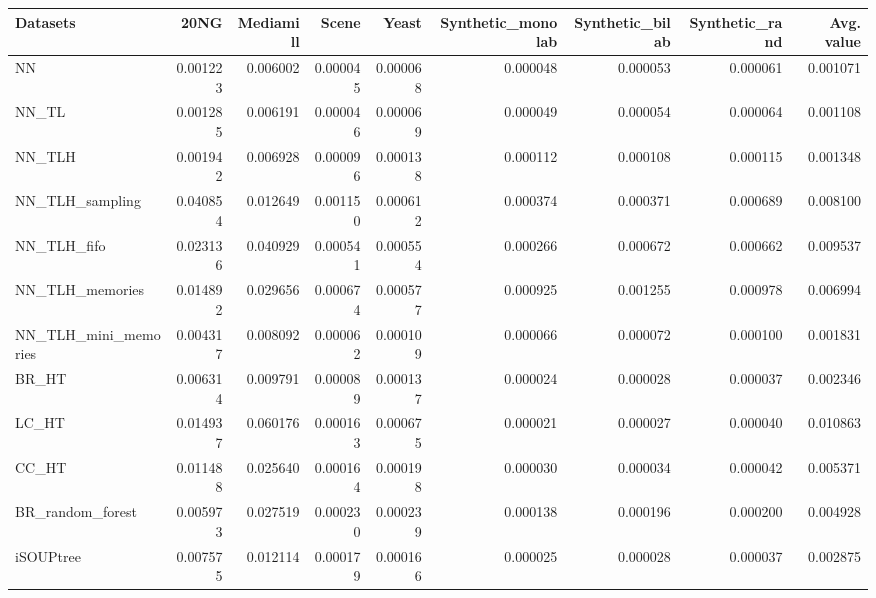 \begin{tabular}{lrrrrrrrr}
\toprule
Datasets &      20NG &  Mediamill &     Scene &     Yeast &  Synthetic\_monolab &  Synthetic\_bilab &  Synthetic\_rand &  Avg. value \\
\midrule
NN                   &  0.001223 &   0.006002 &  0.000045 &  0.000068 &           0.000048 &         0.000053 &        0.000061 &    0.001071 \\
NN\_TL                &  0.001285 &   0.006191 &  0.000046 &  0.000069 &           0.000049 &         0.000054 &        0.000064 &    0.001108 \\
NN\_TLH               &  0.001942 &   0.006928 &  0.000096 &  0.000138 &           0.000112 &         0.000108 &        0.000115 &    0.001348 \\
NN\_TLH\_sampling      &  0.040854 &   0.012649 &  0.001150 &  0.000612 &           0.000374 &         0.000371 &        0.000689 &    0.008100 \\
NN\_TLH\_fifo          &  0.023136 &   0.040929 &  0.000541 &  0.000554 &           0.000266 &         0.000672 &        0.000662 &    0.009537 \\
NN\_TLH\_memories      &  0.014892 &   0.029656 &  0.000674 &  0.000577 &           0.000925 &         0.001255 &        0.000978 &    0.006994 \\
NN\_TLH\_mini\_memories &  0.004317 &   0.008092 &  0.000062 &  0.000109 &           0.000066 &         0.000072 &        0.000100 &    0.001831 \\
BR\_HT                &  0.006314 &   0.009791 &  0.000089 &  0.000137 &           0.000024 &         0.000028 &        0.000037 &    0.002346 \\
LC\_HT                &  0.014937 &   0.060176 &  0.000163 &  0.000675 &           0.000021 &         0.000027 &        0.000040 &    0.010863 \\
CC\_HT                &  0.011488 &   0.025640 &  0.000164 &  0.000198 &           0.000030 &         0.000034 &        0.000042 &    0.005371 \\
BR\_random\_forest     &  0.005973 &   0.027519 &  0.000230 &  0.000239 &           0.000138 &         0.000196 &        0.000200 &    0.004928 \\
iSOUPtree            &  0.007575 &   0.012114 &  0.000179 &  0.000166 &           0.000025 &         0.000028 &        0.000037 &    0.002875 \\
\bottomrule
\end{tabular}
